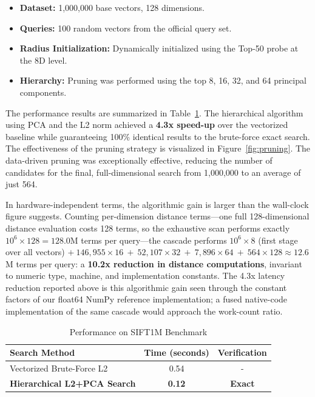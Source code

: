 \documentclass[sigconf]{acmart}
\begin{document}
\begin{itemize}
    \item \textbf{Dataset:} 1,000,000 base vectors, 128 dimensions.
    \item \textbf{Queries:} 100 random vectors from the official query set.
    \item \textbf{Radius Initialization:} Dynamically initialized using the Top-50 probe at the 8D level.
    \item \textbf{Hierarchy:} Pruning was performed using the top 8, 16, 32, and 64 principal components.
\end{itemize}

The performance results are summarized in Table~\ref{tab:results}. The hierarchical algorithm using PCA and the L2 norm achieved a \textbf{4.3x speed-up} over the vectorized baseline while guaranteeing 100\% identical results to the brute-force exact search. The effectiveness of the pruning strategy is visualized in Figure~\ref{fig:pruning}. The data-driven pruning was exceptionally effective, reducing the number of candidates for the final, full-dimensional search from 1,000,000 to an average of just 564.

In hardware-independent terms, the algorithmic gain is larger than the wall-clock figure suggests. Counting per-dimension distance terms---one full 128-dimensional distance evaluation costs 128 terms, so the exhaustive scan performs exactly $10^{6} \times 128 = 128.0$M terms per query---the cascade performs $10^{6}\times 8$ (first stage over all vectors) $+\ 146{,}955\times16\ +\ 52{,}107\times32\ +\ 7{,}896\times64\ +\ 564\times128 \approx 12.6$M terms per query: a \textbf{10.2x reduction in distance computations}, invariant to numeric type, machine, and implementation constants. The 4.3x latency reduction reported above is this algorithmic gain seen through the constant factors of our float64 NumPy reference implementation; a fused native-code implementation of the same cascade would approach the work-count ratio.

\begin{table}[h]
  \caption{Performance on SIFT1M Benchmark}
  \label{tab:results}
  \begin{tabular}{lcc}
    \toprule
    \textbf{Search Method} & \textbf{Time (seconds)} & \textbf{Verification}\\
    \midrule
    Vectorized Brute-Force L2 & 0.54 & - \\
    \textbf{Hierarchical L2+PCA Search} & \textbf{0.12} & \textbf{Exact}\\
    \bottomrule
  \end{tabular}
\end{table}
\end{document}

